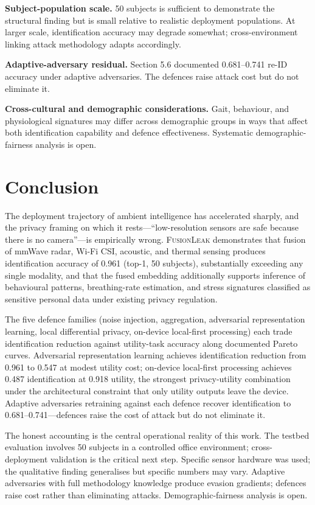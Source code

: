 \documentclass[sigconf,nonacm]{acmart}
\begin{document}
\textbf{Subject-population scale.} 50 subjects is sufficient to
demonstrate the structural finding but is small relative to
realistic deployment populations. At larger scale, identification
accuracy may degrade somewhat; cross-environment linking
attack methodology adapts accordingly.

\textbf{Adaptive-adversary residual.} Section 5.6 documented
0.681--0.741 re-ID accuracy under adaptive adversaries. The
defences raise attack cost but do not eliminate it.

\textbf{Cross-cultural and demographic considerations.} Gait,
behaviour, and physiological signatures may differ across
demographic groups in ways that affect both identification
capability and defence effectiveness. Systematic
demographic-fairness analysis is open.

\section{Conclusion}

The deployment trajectory of ambient intelligence has accelerated
sharply, and the privacy framing on which it rests---``low-resolution
sensors are safe because there is no camera''---is empirically
wrong. \textsc{FusionLeak} demonstrates that fusion of mmWave
radar, Wi-Fi CSI, acoustic, and thermal sensing produces
identification accuracy of 0.961 (top-1, 50 subjects), substantially
exceeding any single modality, and that the fused embedding
additionally supports inference of behavioural patterns,
breathing-rate estimation, and stress signatures classified as
sensitive personal data under existing privacy regulation.

The five defence families (noise injection, aggregation, adversarial
representation learning, local differential privacy, on-device
local-first processing) each trade identification reduction
against utility-task accuracy along documented Pareto curves.
Adversarial representation learning achieves identification
reduction from 0.961 to 0.547 at modest utility cost; on-device
local-first processing achieves 0.487 identification at 0.918
utility, the strongest privacy-utility combination under the
architectural constraint that only utility outputs leave the
device. Adaptive adversaries retraining against each defence
recover identification to 0.681--0.741---defences raise the cost
of attack but do not eliminate it.

The honest accounting is the central operational reality of this
work. The testbed evaluation involves 50 subjects in a controlled
office environment; cross-deployment validation is the critical
next step. Specific sensor hardware was used; the qualitative
finding generalises but specific numbers may vary. Adaptive
adversaries with full methodology knowledge produce evasion
gradients; defences raise cost rather than eliminating attacks.
Demographic-fairness analysis is open.
\end{document}
